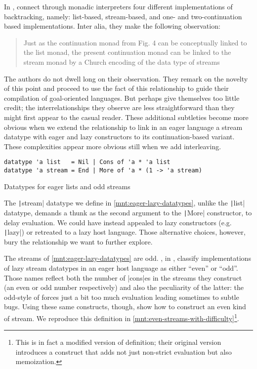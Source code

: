 \documentclass[screen,anonymous,review,draft,natbib=false]{acmart} %
\begin{document}
In , \citeauthor{danvy2002unifying}
connect through monadic interpreters four different implementations of
backtracking, namely: list-based, stream-based, and one- and
two-continuation based implementations. Inter alia, they make the
following observation:
%
\begin{quote}
  Just as the continuation monad from Fig. 4 can be conceptually
  linked to the list monad, the present continuation monad can be
  linked to the stream monad by a Church encoding of the data type of
  streams
\end{quote}
%
The authors do not dwell long on their observation. They remark on the
novelty of this point and proceed to use the fact of this relationship
to guide their compilation of goal-oriented languages. But
\citeauthor{danvy2002unifying} perhaps give themselves too little
credit; the interrelationships they observe are less straightforward
than they might first appear to the casual reader. These additional
subtleties become more obvious when we extend the relationship to link
in an eager language a stream datatype with eager and lazy
constructors to its continuation-based variant. These complexities
appear more obvious still when we add interleaving.

\begin{listing}
\begin{verbatim}
datatype 'a list   = Nil | Cons of 'a * 'a list
datatype 'a stream = End | More of 'a * (1 -> 'a stream)
\end{verbatim}
\caption{Datatypes for eager lists and odd streams}
\label{mnt:eager-lazy-datatypes}
\end{listing}

The \texttt|stream| datatype we define in
\cref{mnt:eager-lazy-datatypes}, unlike the \texttt|list| datatype,
demands a thunk as the second argument to the \texttt|More|
constructor, to delay evaluation. We could have instead appealed to
lazy constructors (e.g. \texttt|lazy|) or retreated to a lazy
host language. Those alternative choices, however, bury the
relationship we want to further explore.

The streams of \cref{mnt:eager-lazy-datatypes} are
odd. \citeauthor{wadler1998add}, in ,
classify implementations of lazy stream datatypes in an eager host
language as either \enquote{even} or \enquote{odd}. Those names
reflect both the number of \rackinline|cons|es in the streams they
construct (an even or odd number respectively) and also the
peculiarity of the latter: the odd-style of forces just a bit too much
evaluation leading sometimes to subtle bugs. Using these same
constructs, though, \citeauthor{wadler1998add} show how to construct
an even kind of stream. We reproduce this definition in
\cref{mnt:even-streams-with-difficulty}\footnote{This is in fact a
  modified version of  definition; their
  original version introduces a construct that adds not just
  non-strict evaluation but also memoization.}.
  
\end{document}
